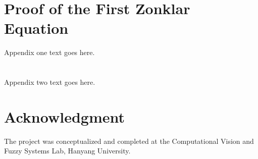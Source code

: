 \documentclass[journal, onecolumn]{IEEEtran}
\begin{document}
%


\appendices
\section{Proof of the First Zonklar Equation}
Appendix one text goes here.

\section{}
Appendix two text goes here.


\section*{Acknowledgment}


The project was conceptualized and completed at the Computational Vision and Fuzzy Systems Lab, Hanyang University.


\ifCLASSOPTIONcaptionsoff
  \newpage
\fi




\end{document}
